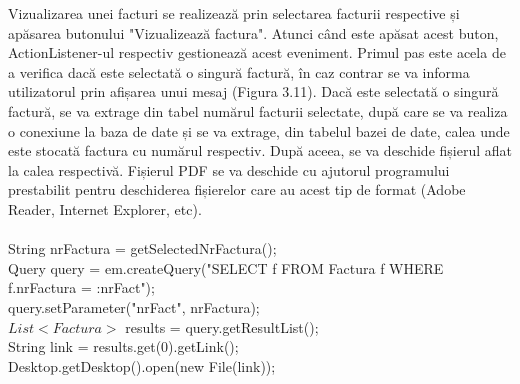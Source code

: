 \documentclass[12pt]{book}
\begin{document}
Vizualizarea unei facturi se realizează prin selectarea facturii respective și apăsarea butonului "Vizualizează factura". Atunci când este apăsat acest buton, ActionListener-ul respectiv gestionează acest eveniment. Primul pas este acela de a verifica dacă este selectată o singură factură, în caz contrar se va informa utilizatorul prin afișarea unui mesaj (Figura 3.11). Dacă este selectată o singură factură, se va extrage din tabel numărul facturii selectate, după care se va realiza o conexiune la baza de date și se va extrage, din tabelul bazei de date, calea unde este stocată factura cu numărul respectiv. După aceea, se va deschide fișierul aflat la calea respectivă. Fișierul PDF se va deschide cu ajutorul programului prestabilit pentru deschiderea fișierelor care au acest tip de format (Adobe Reader, Internet Explorer, etc). \\\\
String nrFactura = getSelectedNrFactura();\\
Query query = em.createQuery("SELECT f FROM Factura f WHERE f.nrFactura = :nrFact");\\
query.setParameter("nrFact", nrFactura);\\
$List<$$Factura>$ results = query.getResultList();\\
String link = results.get(0).getLink();\\
Desktop.getDesktop().open(new File(link));\\
\end{document}
